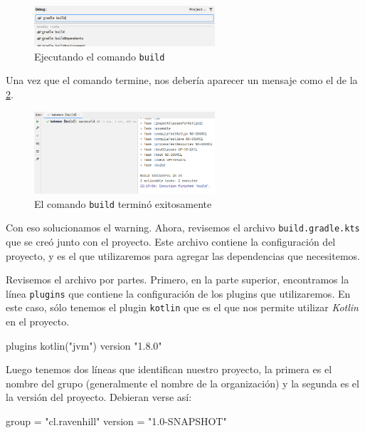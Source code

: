   \begin{figure}[ht!]
    \centering
    \includegraphics[width=0.6\textwidth]{img/oop/tdd/gradle/gradle-build.png}
    \caption{Ejecutando el comando \texttt{build}}
    \label{fig:gradle-build}
  \end{figure}

  Una vez que el comando termine, nos debería aparecer un mensaje como el de la
  \cref{fig:gradle-build-success}.

  \begin{figure}[ht!]
    \centering
    \includegraphics[width=0.6\textwidth]{img/oop/tdd/gradle/gradle-build-success.png}
    \caption{El comando \texttt{build} terminó exitosamente}
    \label{fig:gradle-build-success}
  \end{figure}

  Con eso solucionamos el warning.
  Ahora, revisemos el archivo \texttt{build.gradle.kts} que se creó junto con el proyecto.
  Este archivo contiene la configuración del proyecto, y es el que utilizaremos para agregar
  las dependencias que necesitemos.

  Revisemos el archivo por partes.
  Primero, en la parte superior, encontramos la línea \texttt{plugins} que contiene la
  configuración de los plugins que utilizaremos.
  En este caso, sólo tenemos el plugin \texttt{kotlin} que es el que nos permite utilizar
  \textit{Kotlin} en el proyecto.
  
  \begin{kotlin}
    plugins {
        kotlin("jvm") version "1.8.0"
    }
  \end{kotlin}

  Luego tenemos dos líneas que identifican nuestro proyecto, la primera es el nombre del grupo 
  (generalmente el nombre de la organización) y la segunda es el la versión del proyecto.
  Debieran verse así:

  \begin{kotlin}
    group = "cl.ravenhill"
    version = "1.0-SNAPSHOT"
  \end{kotlin}

